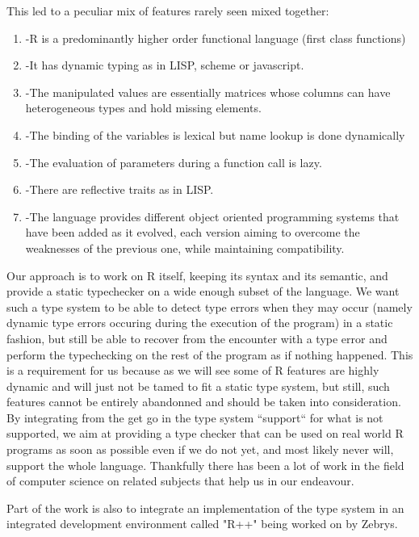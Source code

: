 This led to a peculiar mix of features rarely seen mixed together:
\begin{enumerate}
\item[]-R is a predominantly higher order functional language (first class functions)
\item[]-It has dynamic typing as in LISP, scheme or javascript.
\item[]-The manipulated values are essentially matrices whose columns can have heterogeneous types and hold missing elements.
\item[]-The binding of the variables is lexical but name lookup is done dynamically
\item[]-The evaluation of parameters during a function call is lazy.
\item[]-There are reflective traits as in LISP.
\item[]-The language provides different object oriented programming systems that have been added as it evolved, each version aiming to overcome the weaknesses of the previous one, while maintaining compatibility.
\end{enumerate}

Our approach is to work on R itself, keeping its syntax and its semantic, and provide a static typechecker on a wide enough subset of the language. We want such a type system to be able to detect type errors when they may occur (namely dynamic type errors occuring during the execution of the program) in a static fashion, but still be able to recover from the encounter with a type error and  perform the typechecking on the rest of the program as if nothing happened. This is a requirement for us because as we will see some of R features are highly dynamic and will just not be tamed to fit a static type system, but still, such features cannot be entirely abandonned and should be taken into consideration. By integrating from the get go in the type system ``support`` for what is not supported, we aim at providing a type checker that can be used on real world R programs as soon as possible even if we do not yet, and most likely never will, support the whole language. Thankfully there has been a lot of work in the field of computer science on related subjects that help us in our endeavour.

Part of the work is also to integrate an implementation of the type system in an integrated development environment called "R++" being worked on by Zebrys.


